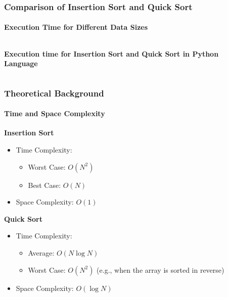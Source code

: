 \begin{frame}
\frametitle{Comparison of Insertion Sort and Quick Sort}
  \framesubtitle{Execution Time for Different Data Sizes}
\begin{columns}
    \begin{column}{0.3\textwidth}
      \centering
      \textbf{Execution time for Insertion Sort and Quick Sort in Python Language}

    \end{column}
    \begin{column}{0.7\textwidth}
    \end{column}
  \end{columns}
\end{frame}




\begin{frame}
  \frametitle{Theoretical Background}
  \framesubtitle{Time and Space Complexity}

  \textbf{Insertion Sort}
  \begin{itemize}
    \item Time Complexity:
      \begin{itemize}
        \item Worst Case: \(O(N^2)\)
        \item Best Case: \(O(N)\)
      \end{itemize}
    \item Space Complexity: \(O(1)\)
  \end{itemize}

  \textbf{Quick Sort}
  \begin{itemize}
    \item Time Complexity:
      \begin{itemize}
        \item Average: \(O(N \log N)\)
        \item Worst Case: \(O(N^2)\) (e.g., when the array is sorted in reverse)
      \end{itemize}
    \item Space Complexity: \(O(\log N)\)
  \end{itemize}
\end{frame}

